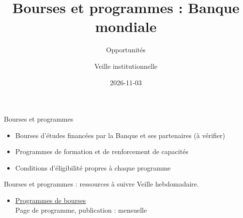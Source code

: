 \documentclass[aspectratio=169,11pt]{beamer}
\title{Bourses et programmes : Banque mondiale}
\subtitle{Opportunités}
\author{Veille institutionnelle}
\date{2026-11-03}
\begin{document}
\begin{frame}\titlepage\end{frame}

\begin{frame}{Bourses et programmes}
\begin{itemize}
\item Bourses d'études financées par la Banque et ses partenaires (à vérifier)
\item Programmes de formation et de renforcement de capacités
\item Conditions d'éligibilité propres à chaque programme
\end{itemize}
\end{frame}

\begin{frame}{Bourses et programmes : ressources à suivre}
\small
Veille hebdomadaire.
\begin{itemize}
\item \href{https://www.worldbank.org/en/programs/scholarships}{Programmes de bourses}\\{\footnotesize Page de programme, publication : mensuelle}
\end{itemize}
\end{frame}
\end{document}
